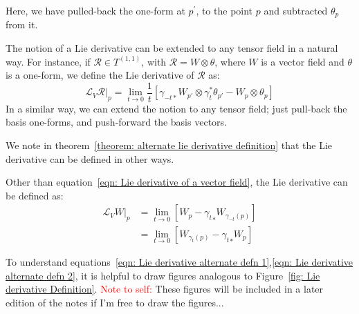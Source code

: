     \begin{remark}
      Here, we have pulled-back the one-form at $p^\prime$, to the point $p$
      and subtracted $\theta_p$ from it.
    \end{remark}
    The notion of a Lie derivative can be extended to any tensor field in a
    natural way. For instance, if $\mathcal{R} \in T^{(1,1)}$, with
    $\mathcal{R} = W \otimes \theta$, where $W$ is a vector field and
    $\theta$ is a one-form, we define the Lie derivative of $\mathcal{R}$ as:
    \begin{equation}
    \label{eqn: Lie derivative of a 1-1 tensor}
      \mathcal{L}_{V}\mathcal{R}\bigr|_{p} = \lim_{t \rightarrow 0
      }\frac{1}{t}\left[\gamma_{-t*}W_{p'} \otimes \gamma_t^{*}\theta_{p'} -
      W_p \otimes \theta_p \right]
    \end{equation}
    In a similar way, we can extend the notion to any tensor field; just
    pull-back the basis one-forms, and push-forward the basis vectors.

    We note in theorem~\ref{theorem: alternate lie derivative definition}
    that the Lie derivative can be defined in other ways.
    \begin{theorem}
      \label{theorem: alternate lie derivative definition}
      Other than equation~\ref{eqn: Lie derivative of a vector field}, the
      Lie derivative can be defined as:
      \begin{align}
        \mathcal{L}_V W\Bigr|_p 
        &= \lim_{t \to 0}[W_p - {\gamma_{t}}_*W_{\gamma_{-t}(p)}] \label{eqn:
        Lie derivative alternate defn 1}\\
        &= \lim_{t \to 0}[W_{\gamma_t(p)} - {\gamma_{t}}_*W_{p}] \label{eqn:
        Lie derivative alternate defn 2}
      \end{align}
    \end{theorem}
    \begin{remark}
      To understand equations~\ref{eqn: Lie derivative alternate defn
      1},\ref{eqn: Lie derivative alternate defn 2}, it is helpful to draw
      figures analogous to Figure~\ref{fig: Lie derivative Definition}.
      \textcolor{red}{Note to self:} These figures will be included in a
      later edition of the notes if I'm free to draw the figures...
    \end{remark}
